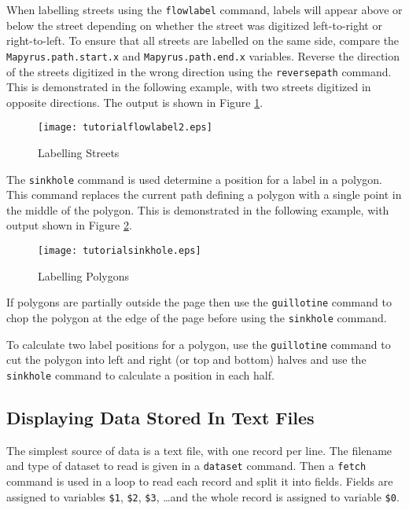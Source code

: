 When labelling streets using the \texttt{flowlabel} command,
labels will appear above or below the street depending on whether
the street was digitized left-to-right or right-to-left.
To ensure that all streets are labelled on the same side, compare the
\texttt{Mapyrus.path.start.x} and \texttt{Mapyrus.path.end.x}
variables.
Reverse the direction of the streets digitized in the wrong
direction using the \texttt{reversepath} command.
This is demonstrated in the following example, with two streets
digitized in opposite directions.
The output is shown in Figure \ref{tutoriallabels5}.



\begin{figure}[htb]
\texttt{[image: tutorialflowlabel2.eps]}
\caption{Labelling Streets}
\label{tutoriallabels5}
\end{figure}

The \texttt{sinkhole} command is used determine a position
for a label in a polygon.  This command
replaces the current path defining a polygon with a single point in
the middle of the polygon.  This is demonstrated in the following
example, with output shown in Figure \ref{tutorialsinkhole}.



\begin{figure}[htb]
\texttt{[image: tutorialsinkhole.eps]}
\caption{Labelling Polygons}
\label{tutorialsinkhole}
\end{figure}

If polygons are partially outside the page then
use the \texttt{guillotine} command to chop the
polygon at the edge of the page before using the \texttt{sinkhole}
command.

To calculate two label positions for a polygon, use the \texttt{guillotine}
command to cut the polygon into left and right (or top and bottom)
halves and use the \texttt{sinkhole} command to calculate a
position in each half.

\subsection{Displaying Data Stored In Text Files}

The simplest source of data is a text file, with one record per line.  The
filename and type of dataset to read is given in a \texttt{dataset} command.
Then a \texttt{fetch} command is used in a loop to read each record
and split it into fields.
Fields are assigned to variables
\texttt{\$1}, \texttt{\$2}, \texttt{\$3}, \dots and the whole record is
assigned to variable \texttt{\$0}.

